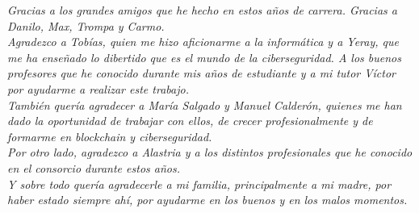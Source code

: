 \textit{Gracias a los grandes amigos que he hecho en estos años de carrera. Gracias a Danilo, Max, Trompa y Carmo.}\\

\textit{Agradezco a Tobías, quien me hizo aficionarme a la informática y a Yeray, que me ha enseñado lo dibertido que es el mundo de la ciberseguridad. A los buenos profesores que he conocido durante mis años de estudiante y a mi tutor Víctor por ayudarme a realizar este trabajo.}\\

\textit{También quería agradecer a María Salgado y Manuel Calderón, quienes me han dado la oportunidad de trabajar con ellos, de crecer profesionalmente y de formarme en blockchain y ciberseguridad.}\\

\textit{Por otro lado, agradezco a Alastria y a los distintos profesionales que he conocido en el consorcio durante estos años.}\\

\textit{Y sobre todo quería agradecerle a mi familia, principalmente a mi madre, por haber estado siempre ahí, por ayudarme en los buenos y en los malos momentos.}\\




